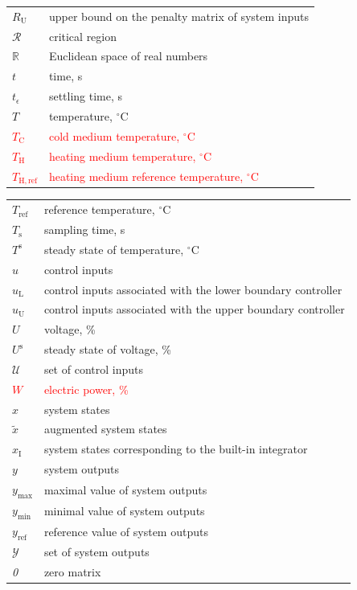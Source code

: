 \documentclass[preprint,12pt]{elsarticle}
\newcommand{\change}[1]{\textcolor{red}{#1}}
\begin{document}
\begin{tabular}{ l l }
			$R_{\mathrm{U}}$ & upper bound on the penalty matrix of system inputs \\
			$\mathcal{R}$ & critical region \\
			$\mathbb{R}$ & Euclidean space of real numbers \\
			$t$ & time, s \\
			$t_{\epsilon}$ & settling time, s \\
			$T$ & temperature, $^{\circ}\mathrm{C}$ \\
			\change{$T_{\mathrm{C}}$} & \change{cold medium temperature, $^{\circ}\mathrm{C}$} \\
			\change{$T_{\mathrm{H}}$} & \change{heating medium temperature, $^{\circ}\mathrm{C}$} \\
			\change{$T_{\mathrm{H, ref}}$} & \change{heating medium reference temperature, $^{\circ}\mathrm{C}$} \\			
		\end{tabular}
	
	
		\begin{tabular}{ l l }
			$T_{\mathrm{ref}}$ & reference temperature, $^{\circ}\mathrm{C}$ \\
			$T_{\mathrm{s}}$ & sampling time, s \\
			$T^{\mathrm{s}}$ & steady state of temperature, $^{\circ}\mathrm{C}$ \\
			$u$ & control inputs \\
			$u_{\mathrm{L}}$ & control inputs associated with the lower boundary controller\\
			$u_{\mathrm{U}}$ & control inputs associated with the upper boundary controller\\
			$U$ & voltage, \% \\
			$U^{\mathrm{s}}$ & steady state of voltage, \% \\
			$\mathcal{U}$ & set of control inputs \\
			\change{$W$} & \change{electric power, \%} \\			
			$x$ & system states \\
			$\widetilde{x}$ & augmented system states \\
			$x_{\mathrm{I}}$ & system states corresponding to the built-in integrator \\
			$y$ & system outputs \\
			$y_\mathrm{\max}$ & maximal value of system outputs \\
			$y_\mathrm{\min}$ & minimal value of system outputs \\
			$y_\mathrm{ref}$ & reference value of system outputs \\
			$\mathcal{Y}$ & set of system outputs \\
			\textit{0} & zero matrix
		\end{tabular}
	
\end{document}
